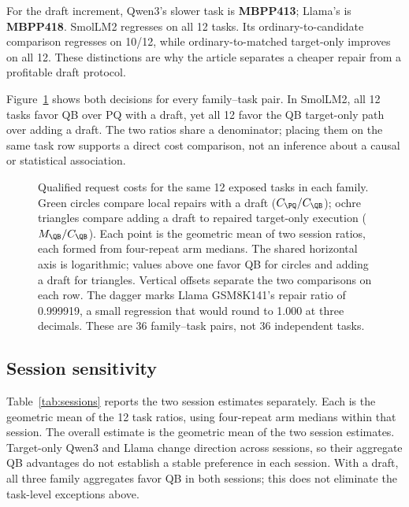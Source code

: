 For the draft increment, Qwen3's slower task is \textbf{MBPP413}; Llama's is \textbf{MBPP418}. SmolLM2 regresses on all 12 tasks. Its ordinary-to-candidate comparison regresses on 10/12, while ordinary-to-matched target-only improves on all 12. These distinctions are why the article separates a cheaper repair from a profitable draft protocol.

Figure~\ref{fig:taskcost} shows both decisions for every family--task pair. In SmolLM2, all 12 tasks favor QB over PQ with a draft, yet all 12 favor the QB target-only path over adding a draft. The two ratios share a denominator; placing them on the same task row supports a direct cost comparison, not an inference about a causal or statistical association.

\begin{figure}[t]
\centering
\caption{Qualified request costs for the same 12 exposed tasks in each family. Green circles compare local repairs with a draft ($C_{\PQ}/C_{\QB}$); ochre triangles compare adding a draft to repaired target-only execution ($M_{\QB}/C_{\QB}$). Each point is the geometric mean of two session ratios, each formed from four-repeat arm medians. The shared horizontal axis is logarithmic; values above one favor QB for circles and adding a draft for triangles. Vertical offsets separate the two comparisons on each row. The dagger marks Llama GSM8K141's repair ratio of 0.999919, a small regression that would round to 1.000 at three decimals. These are 36 family--task pairs, not 36 independent tasks.}
\label{fig:taskcost}
\end{figure}

\subsection{Session sensitivity}
Table~\ref{tab:sessions} reports the two session estimates separately. Each is the geometric mean of the 12 task ratios, using four-repeat arm medians within that session. The overall estimate is the geometric mean of the two session estimates. Target-only Qwen3 and Llama change direction across sessions, so their aggregate QB advantages do not establish a stable preference in each session. With a draft, all three family aggregates favor QB in both sessions; this does not eliminate the task-level exceptions above.

